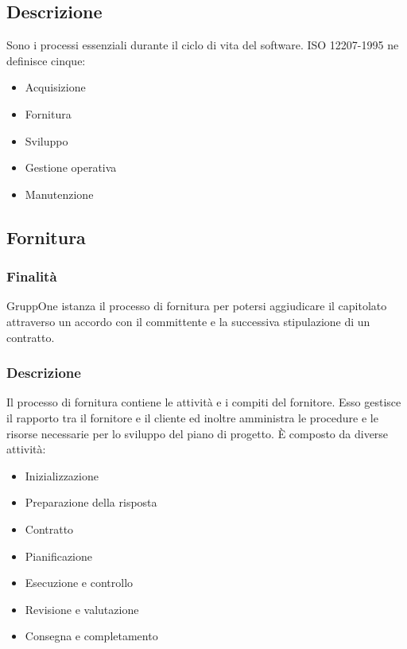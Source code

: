 \documentclass[../norme-di-progetto.tex]{subfiles}
\begin{document}
\subsection{Descrizione}%
\label{sub:processi_primari/descrizione}
Sono i processi essenziali durante il ciclo di vita del software. ISO 12207-1995 ne definisce cinque:

\begin{itemize}
  \item Acquisizione
  \item Fornitura
  \item Sviluppo
  \item Gestione operativa
  \item Manutenzione
\end{itemize}

\subsection{Fornitura}%
\label{sub:fornitura}

\subsubsection{Finalità}%
\label{subs:fornitura/finalita}

GruppOne istanza il processo di fornitura per potersi aggiudicare il capitolato attraverso un accordo con il committente e la successiva stipulazione di un contratto.

\subsubsection{Descrizione}%
\label{subs:fornitura/descrizione}

Il processo di fornitura contiene le attività e i compiti del fornitore. Esso gestisce il rapporto tra il fornitore e il cliente ed inoltre amministra le procedure e le risorse necessarie per lo sviluppo del piano di progetto. È composto da diverse attività:

\begin{itemize}
  \item Inizializzazione
  \item Preparazione della risposta
  \item Contratto
  \item Pianificazione
  \item Esecuzione e controllo
  \item Revisione e valutazione
  \item Consegna e completamento
\end{itemize}
\end{document}
